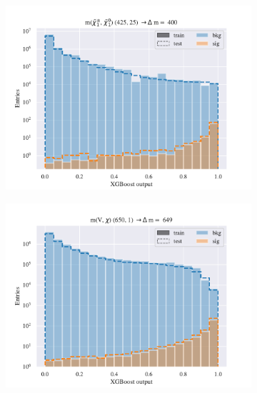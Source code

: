\begin{figure}[H]
\begin{subfigure}[t!]{0.49\textwidth}
        \includegraphics[width = \textwidth]{Figures/WW/BDT/Low_level/High/scaled_train_test_395330.pdf}
        \caption{}
        \label{fig:traintestscaled}
    \end{subfigure}
    \begin{subfigure}[t!]{0.49\textwidth}
        \includegraphics[width = \textwidth]{Figures/Mono_Z/ML/BDT/Low_level/High/scaled_train_test_310617.pdf}
        \caption{}
        \label{fig:ROCBDTLow_low_level}
    \end{subfigure}
    \caption{}
    \label{fig:resExample}
\end{figure}









